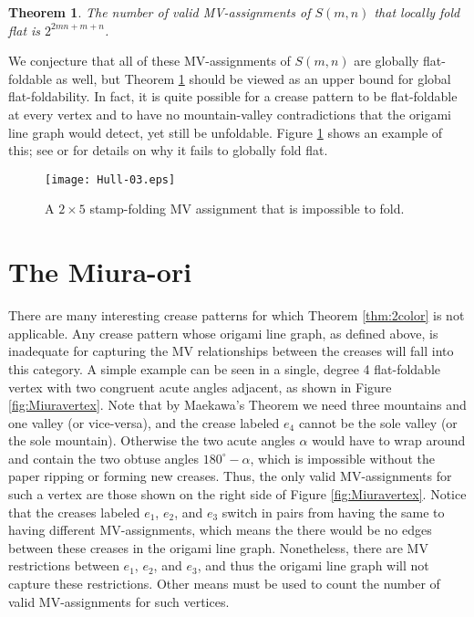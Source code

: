 \documentclass{amsart}
\newtheorem{theorem}{Theorem}[section]
\theoremstyle{definition}
\begin{document}
\begin{theorem}\label{thm:sqtwist}
The number of valid MV-assignments of $S(m,n)$ that locally fold flat is $2^{2mn+m+n}$.
\end{theorem} 

We conjecture that all of these MV-assignments of $S(m,n)$ are globally flat-foldable as well, but Theorem \ref{thm:sqtwist} should be viewed as an upper bound for global flat-foldability.  In fact, it is quite possible for a crease pattern to be flat-foldable at every vertex and to have no mountain-valley contradictions that the origami line graph would detect, yet still be unfoldable.  Figure \ref{fig:imposs} shows an example of this; see \cite{Justin} or \cite{GHull} for details on why it fails to globally fold flat.

\begin{figure}
\centerline{\texttt{[image: Hull-03.eps]}}
\caption{A $2\times 5$ stamp-folding MV assignment that is impossible to fold.}\label{fig:imposs}
\end{figure}

\section{The Miura-ori}

There are many interesting crease patterns for which Theorem \ref{thm:2color} is not applicable.  Any crease pattern whose origami line graph, as defined above, is inadequate for capturing the MV relationships between the creases will fall into this category.  A simple example can be seen in a single, degree 4 flat-foldable vertex  with two congruent acute angles adjacent, as shown in Figure \ref{fig:Miuravertex}.  Note that by Maekawa's Theorem we need three mountains and one valley (or vice-versa), and the crease labeled $e_4$ cannot be the sole valley (or the sole mountain).  Otherwise the two acute angles $\alpha$ would have to wrap around and contain the two obtuse angles $180^\circ-\alpha$, which is impossible without the paper ripping or forming new creases.  Thus, the only valid MV-assignments for such a vertex are those shown on the right side of Figure \ref{fig:Miuravertex}.  Notice that the creases labeled $e_1$, $e_2$, and $e_3$ switch in pairs from having the same to having different MV-assignments, which means the there would be no edges between these creases in the origami line graph.  Nonetheless, there are MV restrictions between $e_1$, $e_2$, and $e_3$, and thus the origami line graph will not capture these restrictions.  Other means must be used to count the number of valid MV-assignments for such vertices.
\end{document}

